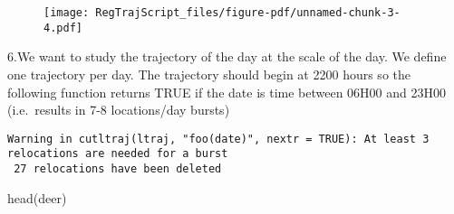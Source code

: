 \documentclass[
  letterpaper,
]{book}
\newenvironment{Shaded}{\begin{snugshade}}{\end{snugshade}}
\newcommand{\AttributeTok}[1]{\textcolor[rgb]{0.40,0.45,0.13}{#1}}
\newcommand{\CommentTok}[1]{\textcolor[rgb]{0.37,0.37,0.37}{#1}}
\newcommand{\ConstantTok}[1]{\textcolor[rgb]{0.56,0.35,0.01}{#1}}
\newcommand{\ControlFlowTok}[1]{\textcolor[rgb]{0.00,0.23,0.31}{#1}}
\newcommand{\FloatTok}[1]{\textcolor[rgb]{0.68,0.00,0.00}{#1}}
\newcommand{\FunctionTok}[1]{\textcolor[rgb]{0.28,0.35,0.67}{#1}}
\newcommand{\NormalTok}[1]{\textcolor[rgb]{0.00,0.23,0.31}{#1}}
\newcommand{\OtherTok}[1]{\textcolor[rgb]{0.00,0.23,0.31}{#1}}
\newcommand{\SpecialCharTok}[1]{\textcolor[rgb]{0.37,0.37,0.37}{#1}}
\newcommand{\StringTok}[1]{\textcolor[rgb]{0.13,0.47,0.30}{#1}}
\begin{document}
\begin{Shaded}
\end{Shaded}

\begin{figure}[H]

{\centering \texttt{[image: RegTrajScript\_files/figure-pdf/unnamed-chunk-3-4.pdf]}

}

\end{figure}

6.We want to study the trajectory of the day at the scale of the day. We
define one trajectory per day. The trajectory should begin at 2200 hours
so the following function returns TRUE if the date is time between 06H00
and 23H00 (i.e.~results in 7-8 locations/day bursts)

\begin{Shaded}
\end{Shaded}

\begin{verbatim}
Warning in cutltraj(ltraj, "foo(date)", nextr = TRUE): At least 3 relocations are needed for a burst
 27 relocations have been deleted
\end{verbatim}

\begin{Shaded}
\begin{Highlighting}[]
\FunctionTok{head}\NormalTok{(deer)}
\end{Highlighting}
\end{Shaded}
\end{document}
